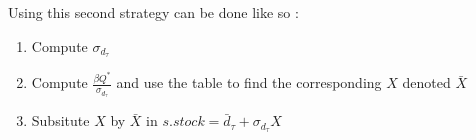 \begin{enumerate}
    Using this second strategy can be done like so :
    \begin{enumerate}
        \item Compute $\sigma_{d_\tau}$
        \item Compute $\frac{\beta Q^*}{\sigma_{d_\tau}}$ and use the table to find the corresponding $X$ denoted $\bar X$
        \item Subsitute $X$ by $\bar X$ in $s.stock = \bar d_\tau + \sigma_{d_\tau}X$
    \end{enumerate}
\end{enumerate}